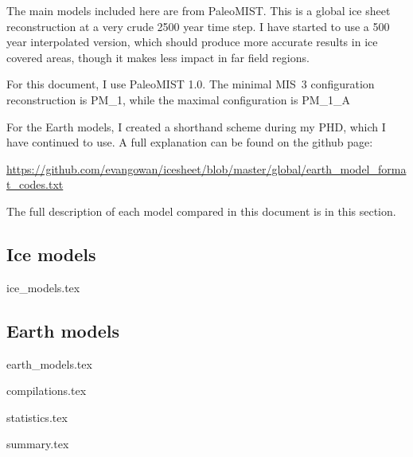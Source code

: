 \documentclass[a4paper,12pt]{article}
\begin{document}
The main models included here are from PaleoMIST. This is a global ice sheet reconstruction at a very crude 2500 year time step. I have started to use a 500 year interpolated version, which should produce more accurate results in ice covered areas, though it makes less impact in far field regions.

For this document, I use PaleoMIST 1.0. The minimal MIS~3 configuration reconstruction is PM\_1, while the maximal configuration is PM\_1\_A

For the Earth models, I created a shorthand scheme during my PHD, which I have continued to use. A full explanation can be found on the github page:

\url{https://github.com/evangowan/icesheet/blob/master/global/earth_model_format_codes.txt}

The full description of each model compared in this document is in this section.



\subsection{Ice models}

{ice_models.tex}

\subsection{Earth models}

{earth_models.tex}

\newpage


{compilations.tex}

\newpage

{statistics.tex}


\newpage

{summary.tex}

\clearpage

\newpage



\end{document}
